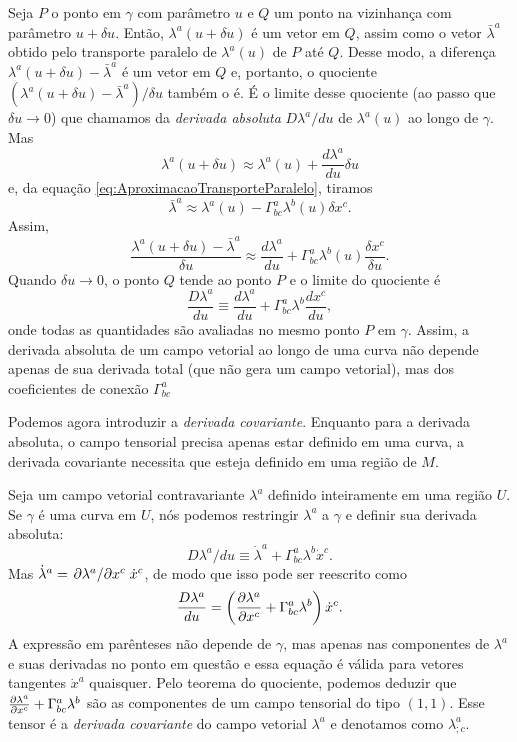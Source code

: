 Seja $ P $ o ponto em $ \gamma $ com parâmetro $ u $ e $ Q $ um ponto na vizinhança com parâmetro $ u+\delta u $. Então, $ \lambda^{a}(u+\delta u) $ é um vetor em $ Q $, assim como o vetor $ \bar{\lambda}^{a} $ obtido pelo transporte paralelo de $ \lambda^{a}(u) $ de $ P $ até $ Q$. Desse modo, a diferença $ \lambda^{a}(u+\delta u)-\bar{\lambda}^{a} $ é um vetor em $ Q $ e, portanto, o quociente $ \left(\lambda^{a}(u+\delta u)-\bar{\lambda}^{a}\right) / \delta u $ também o é. É o limite desse quociente (ao passo que $ \delta u \rightarrow 0 $) que chamamos da \textit{derivada absoluta} $ D \lambda^{a} / d u $ de $ \lambda^{a}(u) $ ao longo de $ \gamma $. Mas
\[
\lambda^{a}(u+\delta u) \approx \lambda^{a}(u)+\frac{d \lambda^{a}}{d u} \delta u
\]
e, da equação \eqref{eq:AproximacaoTransporteParalelo}, tiramos
\[
\bar{\lambda}^{a} \approx \lambda^{a}(u)-\Gamma_{b c}^{a} \lambda^{b}(u) \delta x^{c} .
\]
Assim,
\[
\frac{\lambda^{a}(u+\delta u)-\bar{\lambda}^{a}}{\delta u} \approx \frac{d \lambda^{a}}{d u}+\Gamma_{b c}^{a} \lambda^{b}(u) \frac{\delta x^{c}}{\delta u} .
\]
Quando $ \delta u \rightarrow 0 $, o ponto $ Q $ tende ao ponto $ P $ e o limite do quociente é 
\begin{equation}\label{eq:DerivadaAbsolutaDefinicao}
\boxed{
\frac{D \lambda^{a}}{d u} \equiv \frac{d \lambda^{a}}{d u}+\Gamma_{b c}^{a} \lambda^{b} \frac{d x^{c}}{d u} ,
}
\end{equation}
onde todas as quantidades são avaliadas no mesmo ponto $ P $ em $ \gamma $. Assim, a derivada absoluta de um campo vetorial ao longo de uma curva não depende apenas de sua derivada total (que não gera um campo vetorial), mas dos coeficientes de conexão $ \Gamma_{b c}^{a} $ 

Podemos agora introduzir a \textit{derivada covariante}. Enquanto para a derivada absoluta, o campo tensorial precisa apenas estar definido em uma curva, a derivada covariante necessita que esteja definido em uma região de $M$.

Seja um campo vetorial contravariante $\lambda^a$ definido inteiramente em uma região $U$. Se $\gamma$ é uma curva em $U$, nós podemos restringir $\lambda^a$ a $\gamma$ e definir sua derivada absoluta:
\[
	D\lambda^a/du \equiv \dot{\lambda}^a+\Gamma^a_{bc}\lambda^b\dot{x}^c.
\]
Mas $\dot{\lambda}^a=\pdv*{\lambda^a}{x^c}\dot{x}^c$, de modo que isso pode ser reescrito como
\[
	\frac{D\lambda^a}{du}=\left(\pdv{\lambda^a}{x^c}+\Gamma^a_{bc}\lambda^b \right) \dot{x}^c.
\]
A expressão em parênteses não depende de $\gamma$, mas apenas nas componentes de $\lambda ^a $ e suas derivadas no ponto em questão e essa equação é válida para vetores tangentes $\dot{x}^a$ quaisquer. Pelo teorema do quociente, podemos deduzir que $\pdv{\lambda^a}{x^c}+\Gamma^a_{bc}\lambda^b$ são as componentes de um campo tensorial do tipo $(1,1)$. Esse tensor é a \textit{derivada covariante} do campo vetorial $\lambda^a$ e denotamos como $\lambda^a_{;c}$.

